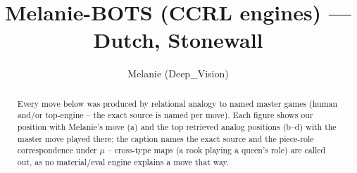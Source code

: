 \documentclass[11pt]{article}
\title{Melanie-BOTS (CCRL engines) — Dutch, Stonewall}
\author{Melanie (Deep\_Vision)}
\date{}
\begin{document}
\maketitle

\begin{abstract}Every move below was produced by relational analogy to named master games (human and/or top-engine -- the exact source is named per move). Each figure shows our position with Melanie's move (a) and the top retrieved analog positions (b--d) with the master move played there; the caption names the exact source and the piece-role correspondence under $\mu$ -- cross-type maps (a rook playing a queen's role) are called out, as no material/eval engine explains a move that way.\end{abstract}

\begin{figure}[p]\centering
\begin{subfigure}{0.46\textwidth}\centering
\resizebox{\linewidth}{!}{%
\newchessgame
\chessboard[
  setfen={rnbqk2r/pp4pp/2pbpn2/3p1p2/2PP4/5NP1/PP2PPBP/RNBQ1RK1 w kq - 0 7},
  showmover=false,
  pgfstyle=straightmove, color=movearrow, markmove={b2-b3}
]}
\caption{}
\end{subfigure}\hfill
\begin{subfigure}{0.46\textwidth}\centering
\resizebox{\linewidth}{!}{%
\newchessgame
\chessboard[
  setfen={rnbqk2r/pp4pp/2pbpn2/3p1p2/2PP4/3BPN2/PP3PPP/RNBQ1RK1 w kq - 2 7},
  showmover=false,
  pgfstyle=straightmove, color=movearrow, markmove={b2-b3}
]}
\caption{}
\end{subfigure}
\\[4pt]
\begin{subfigure}{0.46\textwidth}\centering
\resizebox{\linewidth}{!}{%
\newchessgame
\chessboard[
  setfen={rnbqk2r/pp4pp/2pbpn2/3p1p2/2PP4/5NP1/PP2PPBP/RNBQ1RK1 w kq - 0 7},
  showmover=false,
  pgfstyle=straightmove, color=movearrow, markmove={b2-b3}
]}
\caption{}
\end{subfigure}\hfill
\begin{subfigure}{0.46\textwidth}\centering
\resizebox{\linewidth}{!}{%
\newchessgame
\chessboard[
  setfen={rnbqk2r/pp4pp/2pbpn2/3p1p2/2PP4/5NP1/PP2PPBP/RNBQ1RK1 w kq - 0 7},
  showmover=false,
  pgfstyle=straightmove, color=movearrow, markmove={b2-b3}
]}
\caption{}
\end{subfigure}

\end{figure}
\end{document}
